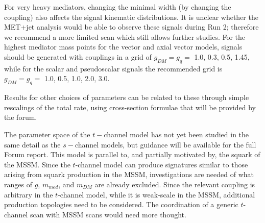 \documentclass[a4,debug,notitlepage,nobib]{tufte-handout}
\newcommand{\mdm}{\ensuremath{m_{DM}}\xspace}
\newcommand{\mmed}{\ensuremath{m_{med}}\xspace}
\newcommand{\gq}{\ensuremath{g_{q}}\xspace}
\begin{document}
For very heavy mediators, changing
the minimal width (by changing the coupling) also affects the signal
kinematic distributions. It is unclear whether the MET+jet analysis
would be able to observe these signals during Run 2; therefore we
recommend a more limited scan which still allows further studies.
For the highest mediator mass points for the vector and axial vector models, 
signals should be generated with couplings in a grid of $g_{DM} = g_{q} = $ 1.0, 0.3, 0.5, 1.45,
while for the scalar and pseudoscalar signals the recommended grid is
$g_{DM} = g_{q} = $ 1.0, 0.5, 1.0, 2.0, 3.0.




Results for other choices of parameters can be related to
these through simple rescalings of the total rate, using cross-section
formulae that will be provided by the forum.

The parameter space of the $t-$channel model 
has not yet been studied in the same detail as the
$s-$channel models, but guidance will be available for the full Forum report. 
This model is parallel to, and partially motivated by, the
squark of the MSSM. Since the $t$-channel model can produce signatures 
similar to those arising from squark production in the MSSM, investigations 
are needed of what ranges of $g$, \mmed, and \mdm are already excluded.
Since the relevant coupling is arbitrary in the $t$-channel model, while
it is weak-scale in the MSSM, additional production topologies need to
be considered. The coordination of a generic $t$-channel scan with
MSSM scans would need more thought.
\end{document}
